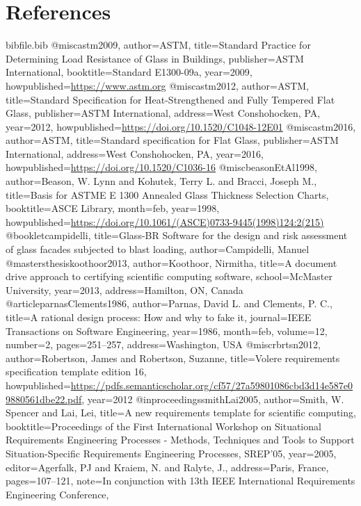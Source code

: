 \documentclass[12pt]{article}
\begin{document}
\section{References}
\label{Sec:References}
\begin{filecontents*}{bibfile.bib}
@misc{astm2009,
author={ASTM},
title={Standard Practice for Determining Load Resistance of Glass in Buildings},
publisher={ASTM International},
booktitle={Standard E1300-09a},
year={2009},
howpublished={\url{https://www.astm.org}}}
@misc{astm2012,
author={ASTM},
title={Standard Specification for Heat-Strengthened and Fully Tempered Flat Glass},
publisher={ASTM International},
address={West Conshohocken, PA},
year={2012},
howpublished={\url{https://doi.org/10.1520/C1048-12E01}}}
@misc{astm2016,
author={ASTM},
title={Standard specification for Flat Glass},
publisher={ASTM International},
address={West Conshohocken, PA},
year={2016},
howpublished={\url{https://doi.org/10.1520/C1036-16}}}
@misc{beasonEtAl1998,
author={Beason, W. Lynn and Kohutek, Terry L. and Bracci, Joseph M.},
title={Basis for ASTME E 1300 Annealed Glass Thickness Selection Charts},
booktitle={ASCE Library},
month=feb,
year={1998},
howpublished={\url{https://doi.org/10.1061/(ASCE)0733-9445(1998)124:2(215)}}}
@booklet{campidelli,
title={Glass-BR Software for the design and risk assessment of glass facades subjected to blast loading},
author={Campidelli, Manuel}}
@mastersthesis{koothoor2013,
author={Koothoor, Nirmitha},
title={A document drive approach to certifying scientific computing software},
school={McMaster University},
year={2013},
address={Hamilton, ON, Canada}}
@article{parnasClements1986,
author={Parnas, David L. and Clements, P. C.},
title={A rational design process: How and why to fake it},
journal={IEEE Transactions on Software Engineering},
year={1986},
month=feb,
volume={12},
number={2},
pages={251--257},
address={Washington, USA}}
@misc{rbrtsn2012,
author={Robertson, James and Robertson, Suzanne},
title={Volere requirements specification template edition 16},
howpublished={\url{https://pdfs.semanticscholar.org/cf57/27a59801086cbd3d14e587e09880561dbe22.pdf}},
year={2012}}
@inproceedings{smithLai2005,
author={Smith, W. Spencer and Lai, Lei},
title={A new requirements template for scientific computing},
booktitle={Proceedings of the First International Workshop on Situational Requirements Engineering Processes - Methods, Techniques and Tools to Support Situation-Specific Requirements Engineering Processes, SREP'05},
year={2005},
editor={Agerfalk, PJ and Kraiem, N. and Ralyte, J.},
address={Paris, France},
pages={107--121},
note={In conjunction with 13th IEEE International Requirements Engineering Conference,}}
\end{filecontents*}
\nocite{*}
\printbibliography[heading=none]
\end{document}
